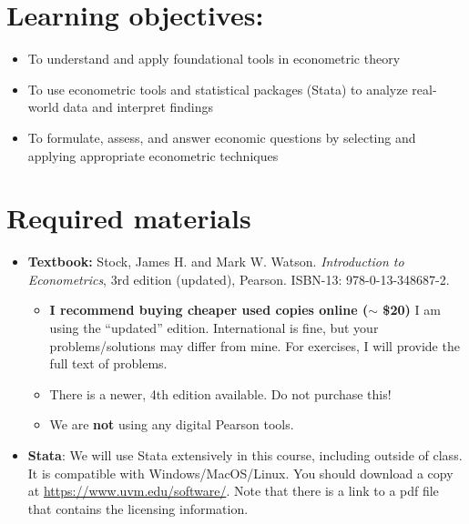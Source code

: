 \documentclass[11pt]{article}
\begin{document}
\hypertarget{learning-objectives}{%
\section*{Learning objectives:}\label{learning-objectives}}

\begin{itemize}
\item
  To understand and apply foundational tools in econometric theory
\item
  To use econometric tools and statistical packages (Stata) to analyze
  real-world data and interpret findings
\item
  To formulate, assess, and answer economic questions by selecting and
  applying appropriate econometric techniques
\end{itemize}

\hypertarget{required-materials}{%
\section*{Required materials}\label{required-materials}}

\begin{itemize}
\item
  \textbf{Textbook:} Stock, James H. and Mark W. Watson.
  \emph{Introduction to Econometrics}, 3rd edition (updated), Pearson.
  ISBN-13: 978-0-13-348687-2.

  \begin{itemize}
  \item
    \textbf{I recommend buying cheaper used copies online (\(\sim\)
    \$20)} I am using the ``updated'' edition. International is fine,
    but your problems/solutions may differ from mine. For exercises, I
    will provide the full text of problems.
  \item
    There is a newer, 4th edition available. Do not purchase this!
  \item
    We are \textbf{not} using any digital Pearson tools.
  \end{itemize}
\item
  \textbf{Stata}: We will use Stata extensively in this course,
  including outside of class. It is compatible with Windows/MacOS/Linux.
  You should download a copy at \url{https://www.uvm.edu/software/}.
  Note that there is a link to a pdf file that contains the licensing
  information.
\end{itemize}
\end{document}
